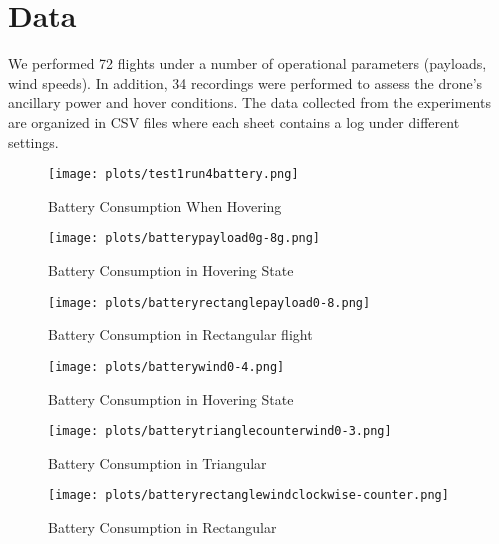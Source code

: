 \documentclass[runningheads]{llncs}
\begin{document}
\section{Data}
\vspace{-0.2 cm}
We performed 72 flights under a number of operational parameters (payloads, wind speeds). In addition, 34 recordings were performed to assess the drone’s ancillary power and hover conditions. The data collected from the experiments are organized in CSV files where each sheet contains a log under different settings.

\begin{figure*}[t]

\centering
  \texttt{[image: plots/test1run4battery.png]}

   \caption{Battery Consumption When Hovering}\label{hover-battery}
\endminipage\hfill
{}%
\centering
  \texttt{[image: plots/batterypayload0g-8g.png]}

   \caption{Battery Consumption in Hovering State}\label{hover-battery-payload}
\endminipage\hfill
{}
  \texttt{[image: plots/batteryrectanglepayload0-8.png]}

  \caption{Battery Consumption in Rectangular flight}\label{rectangle-battery-payload}
\endminipage
\vspace{-0.4 cm}
\end{figure*}

\begin{figure*}[t]

\centering
  \texttt{[image: plots/batterywind0-4.png]}

\caption{Battery Consumption in Hovering State} \label{hover-battery-wind}
\endminipage\hfill
{}%
\centering
  \texttt{[image: plots/batterytrianglecounterwind0-3.png]}

\caption{Battery Consumption in Triangular} \label{triangle-battery-wind}
\endminipage\hfill
{}
  \texttt{[image: plots/batteryrectanglewindclockwise-counter.png]}

\caption{Battery Consumption in Rectangular} \label{rectangle-battery-counter}
\endminipage
\vspace{-0.4 cm}
\end{figure*}
\end{document}
